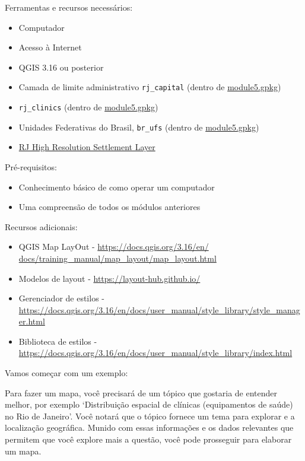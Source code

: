 \documentclass[
]{krantz}
\providecommand{\tightlist}{%
  \setlength{\itemsep}{0pt}\setlength{\parskip}{0pt}}
\begin{document}
Ferramentas e recursos necessários:

\begin{itemize}
\tightlist
\item
  Computador
\item
  Acesso à Internet
\item
  QGIS 3.16 ou posterior
\item
  Camada de limite administrativo \texttt{rj\_capital} (dentro de \href{data/module5/module5.gpkg}{module5.gpkg})
\item
  \texttt{rj\_clinics} (dentro de \href{data/module5/module5.gpkg}{module5.gpkg})
\item
  Unidades Federativas do Brasil, \texttt{br\_ufs} (dentro de \href{data/module5/module5.gpkg}{module5.gpkg})
\item
  \href{data/module5/hrsl_rj_capital_populacao.tif}{RJ High Resolution Settlement Layer}
\end{itemize}

Pré-requisitos:

\begin{itemize}
\tightlist
\item
  Conhecimento básico de como operar um computador
\item
  Uma compreensão de todos os módulos anteriores
\end{itemize}

Recursos adicionais:

\begin{itemize}
\tightlist
\item
  QGIS Map LayOut - \href{https://docs.qgis.org/3.16/en/docs/training_manual/map_layout/map_layout.html}{https://docs.qgis.org/3.16/en/ docs/training\_manual/map\_layout/map\_layout.html}
\item
  Modelos de layout - \url{https://layout-hub.github.io/}
\item
  Gerenciador de estilos - \url{https://docs.qgis.org/3.16/en/docs/user_manual/style_library/style_manager.html}
\item
  Biblioteca de estilos - \url{https://docs.qgis.org/3.16/en/docs/user_manual/style_library/index.html}
\end{itemize}

Vamos começar com um exemplo:

Para fazer um mapa, você precisará de um tópico que gostaria de entender melhor, por exemplo `Distribuição espacial de clínicas (equipamentos de saúde) no Rio de Janeiro'. Você notará que o tópico fornece um tema para explorar e a localização geográfica. Munido com essas informações e os dados relevantes que permitem que você explore mais a questão, você pode prosseguir para elaborar um mapa.
\end{document}
